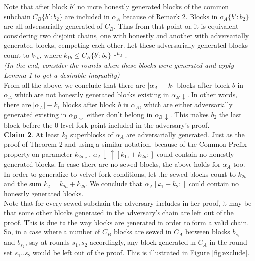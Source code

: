 \documentclass[11pt,a4paper]{article}
\begin{document}
Note that after block $b'$ no more honestly generated blocks of the common subchain $C_B\{b':b_2\}$ are included in $\alpha_A$ because of Remark 2. Blocks in $\alpha_A\{b':b_2\}$ are all adversarially generated of $C_B$. Thus from that point on it is equivalent considering two disjoint chains, one with honestly and another with adversarially generated blocks, competing each other. Let these adversarially generated blocks count to $k_{1b}$,  where $k_{1b} \leq C_B\{b':b_2\}\uparrow^{\mu_A}$.\\ \textit{(In the end, consider the rounds when these blocks were generated and apply Lemma 1 to get a desirable inequality)}\\
From all the above, we conclude that there are $\vert \alpha_A \vert - k_1$ blocks after block $b$ in $\alpha_A$ which are not honestly generated blocks existing in $\alpha_B\downarrow$. In other words, there are $\vert \alpha_A \vert - k_1$ blocks after block $b$ in $\alpha_A$, which are either adversarially generated existing in $\alpha_B\downarrow$ either don't belong in $\alpha_B\downarrow$. This makes $b_2$ the last block before the 0-level fork point included in the adversary's proof.\\
\textbf{Claim 2.} 
At least $k_3$ superblocks of $\alpha_A$ are adversarially generated. Just as the proof of Theorem 2 and using a similar notation, because of the Common Prefix property on parameter $k_{2a\downarrow}$, $\alpha_A \downarrow \uparrow [k_{1a}+k_{2a}:]$ could contain no honestly generated blocks. In case there are no sewed blocks, the above holds for $\alpha_A$ too. In order to generalize to velvet fork conditions, let the sewed blocks count to $k_{2b}$ and the sum $k_2 = k_{2a} + k_{2b}$. We conclude that $\alpha_A [k_{1}+k_{2}:]$ could contain no honestly generated blocks. \\ 
Note that for every sewed subchain the adversary includes in her proof, it may be that some other blocks generated in the adversary's chain are left out of the proof. This is due to the way blocks are generated in order to form a valid chain. So, in a case where a number of $C_B$ blocks are sewed in $C_A$ between blocks $b_{s_1}$ and $b_{s_2}$, say at rounds $s_1, s_2$ accordingly, any block generated in $C_A$ in the round set $s_1..s_2$ would be left out of the proof. This is illustrated in Figure \ref{fig:exclude}.\\
\end{document}
